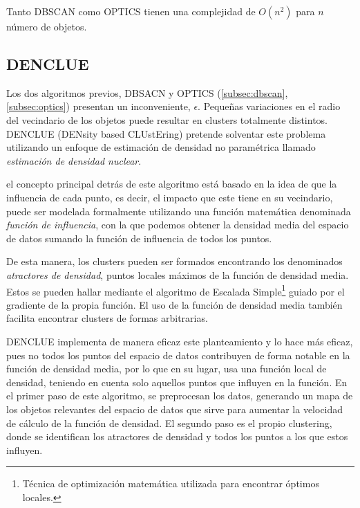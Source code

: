 \documentclass[10pt, a4paper]{article}
\begin{document}
Tanto DBSCAN como OPTICS tienen una complejidad de $O\left(n^2\right)$ para $n$ número de objetos.




\subsection{\textbf{DENCLUE}} \label{subsec:denclue}

Los dos algoritmos previos, DBSACN y OPTICS (\ref{subsec:dbscan}, \ref{subsec:optics}) presentan un inconveniente, $\epsilon$. Pequeñas variaciones en el radio del vecindario de los objetos puede resultar en clusters totalmente distintos. DENCLUE \cite{DENCLUE} (DENsity based CLUstEring) pretende solventar este problema utilizando un enfoque de estimación de densidad no paramétrica llamado \textit{estimación de densidad nuclear}.

el concepto principal detrás de este algoritmo está basado en la idea de que la influencia de cada punto, es decir, el impacto que este tiene en su vecindario, puede ser modelada formalmente utilizando una función matemática denominada \textit{función de influencia}, con la que podemos obtener la densidad media del espacio de datos sumando  la función de influencia de todos los puntos.

De esta manera, los clusters pueden ser formados encontrando los denominados \textit{atractores de densidad}, puntos locales máximos de la función de densidad media. Estos se pueden hallar mediante el algoritmo de Escalada Simple\footnote{Técnica de optimización matemática utilizada para encontrar óptimos locales.} guiado por el gradiente de la propia función. El uso de la función de densidad media también facilita encontrar clusters de formas arbitrarias.

DENCLUE implementa de manera eficaz este planteamiento y lo hace más eficaz, pues no todos los puntos del espacio de datos contribuyen de forma notable en la función de densidad media, por lo que en su lugar, usa una función local de densidad, teniendo en cuenta solo aquellos puntos que influyen en la función. En el primer paso de este algoritmo, se preprocesan los datos, generando un mapa de los objetos relevantes del espacio de datos que sirve para aumentar la velocidad de cálculo de la función de densidad. El segundo paso es el propio clustering, donde se identifican los atractores de densidad y todos los puntos a los que estos influyen.
\end{document}
